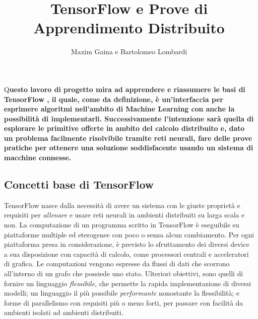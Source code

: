 \documentclass[DIV=calc, paper=a4, fontsize=11pt]{scrartcl}	 %
\title{TensorFlow e Prove di Apprendimento Distribuito} %
\author{Maxim Gaina e Bartolomeo Lombardi} %
\date{} %
\newcommand{\initial}[1]{ %
\lettrine[lines=3,lhang=0.3,nindent=0em]{
\color{DarkGoldenrod}
{\textsf{#1}}}{}}
\begin{document}
	\maketitle
	\thispagestyle{fancy}
	\initial{Q}\textbf{uesto lavoro di progetto mira ad apprendere e riassumere le basi di TensorFlow \cite{tf}, il quale, come da definizione, è un'interfaccia per esprimere algoritmi nell'ambito di Machine Learning con anche la possibilità di implementarli. Successivamente l'intenzione sarà quella di esplorare le primitive offerte in ambito del calcolo distribuito e, dato un problema facilmente risolvibile tramite reti neurali, fare delle prove pratiche per ottenere una soluzione soddisfacente usando un sistema di macchine connesse.}
	
	\begin{multicols}{2}
		\tableofcontents
		\section{Concetti base di TensorFlow}
			TensorFlow nasce dalla necessità di avere un sistema con le giuste proprietà e requisiti per \textit{allenare} e usare reti neurali in ambienti distribuiti su larga scala e non. La computazione di un programma scritto in TensorFlow è eseguibile su piattaforme multiple ed eterogenee con poco o senza alcun cambiamento. Per ogni piattaforma presa in considerazione, è previsto lo sfruttamento dei diversi device a sua disposizione con capacità di calcolo, come processori centrali e acceleratori di grafica. Le computazioni vengono espresse da flussi di dati che scorrono all'interno di un grafo che possiede uno stato. Ulteriori obiettivi, sono quelli di fornire un linguaggio \textit{flessibile}, che permette la rapida implementazione di diversi modelli; un linguaggio il più possibile \textit{performante} nonostante la flessibilità; e forme di parallelismo con requisiti più o meno forti, per passare con facilità da ambienti isolati ad ambienti distribuiti.
		

\end{multicols}
\end{document}

